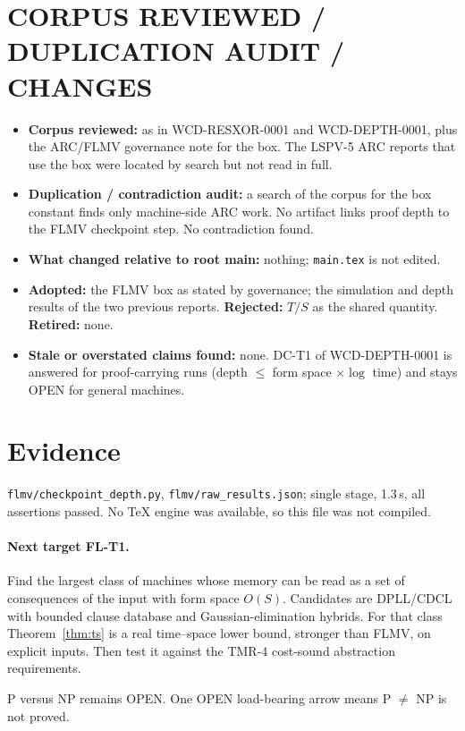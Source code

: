 \documentclass[11pt]{article}
\begin{document}
\section{CORPUS REVIEWED / DUPLICATION AUDIT / CHANGES}
\begin{itemize}
\item \textbf{Corpus reviewed:} as in WCD-RESXOR-0001 and WCD-DEPTH-0001, plus the ARC/FLMV governance note for the box. The LSPV-5 ARC reports that use the box were located by search but not read in full.
\item \textbf{Duplication / contradiction audit:} a search of the corpus for the box constant finds only machine-side ARC work. No artifact links proof depth to the FLMV checkpoint step. No contradiction found.
\item \textbf{What changed relative to root main:} nothing; \texttt{main.tex} is not edited.
\item \textbf{Adopted:} the FLMV box as stated by governance; the simulation and depth results of the two previous reports. \textbf{Rejected:} $T/S$ as the shared quantity. \textbf{Retired:} none.
\item \textbf{Stale or overstated claims found:} none. DC-T1 of WCD-DEPTH-0001 is answered for proof-carrying runs (depth $\le$ form space $\times\log$ time) and stays OPEN for general machines.
\end{itemize}

\section{Evidence}
\texttt{flmv/checkpoint\_depth.py}, \texttt{flmv/raw\_results.json}; single stage, 1.3\,s, all assertions passed. No TeX engine was available, so this file was not compiled.

\paragraph{Next target FL-T1.} Find the largest class of machines whose memory can be read as a set of consequences of the input with form space $O(S)$. Candidates are DPLL/CDCL with bounded clause database and Gaussian-elimination hybrids. For that class Theorem~\ref{thm:ts} is a real time--space lower bound, stronger than FLMV, on explicit inputs. Then test it against the TMR-4 cost-sound abstraction requirements.

\medskip\noindent P versus NP remains OPEN. One OPEN load-bearing arrow means P $\ne$ NP is not proved.
\end{document}
